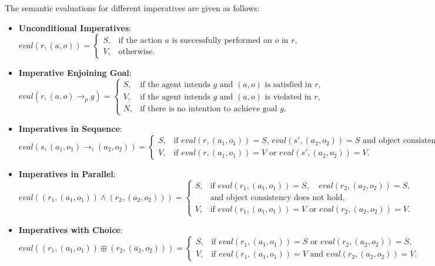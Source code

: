 \documentclass[a4paper,11pt]{lmcs}
\begin{document}
The semantic evaluations for different imperatives are given as follows:

\begin{itemize}
 \item \textbf{Unconditional Imperatives}:
\[
eval(r, (a, o)) =
\begin{cases}
S, & \text{if the action } a \text{ is successfully performed on } o \text{ in } r, \\
V, & \text{otherwise}.
\end{cases}
\]

\item \textbf{Imperative Enjoining Goal}:
\[
eval(r, (a, o) \rightarrow_p g) =
\begin{cases}
S, & \text{if the agent intends } g \text{ and } (a,o) \text{ is satisfied in } r, \\
V, & \text{if the agent intends } g \text{ and } (a,o) \text{ is violated in } r, \\
N, & \text{if there is no intention to achieve goal } g.
\end{cases}
\]

\item \textbf{Imperatives in Sequence}:
\[
eval(s, (a_1, o_1) \rightarrow_i (a_2, o_2)) =
\begin{cases}
S, & \text{if } eval(r, (a_1, o_1)) = S \text{, } eval(s', (a_2, o_2)) = S \text{ and object consistency holds,} \\
V, & \text{if } eval(r, (a_1, o_1)) = V \text{ or } eval(s', (a_2, o_2)) = V.
\end{cases}
\]

\item \textbf{Imperatives in Parallel}:
\[
eval((r_1, (a_1, o_1)) \wedge (r_2, (a_2, o_2))) =
\begin{cases}
S, & \text{if } eval(r_1, (a_1, o_1)) = S, \quad eval(r_2, (a_2, o_2)) = S, \\
& \text{and object consistency does not hold,} \\
V, & \text{if } eval(r_1, (a_1, o_1)) = V \text{ or } eval(r_2, (a_2, o_2)) = V.
\end{cases}
\]

\item \textbf{Imperatives with Choice}:
\[
eval((r_1, (a_1, o_1)) \oplus (r_2, (a_2, o_2))) =
\begin{cases}
S, & \text{if } eval(r_1, (a_1, o_1)) = S \text{ or } eval(r_2, (a_2, o_2)) = S, \\
V, & \text{if } eval(r_1, (a_1, o_1)) = V \text{ and } eval(r_2, (a_2, o_2)) = V.
\end{cases}
\]

\end{itemize}
\end{document}

